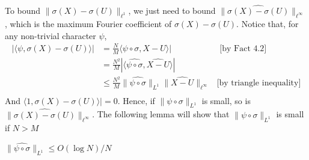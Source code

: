 To bound $\| \sigma(X) - \sigma(U) \|_{\ell^{1}}$, we just need to bound $\|\widehat{ \sigma(X) - \sigma(U)} \|_{\ell^{\infty}}$, which is the maximum Fourier coefficient of $\sigma(X) - \sigma(U)$. Notice that, for any non-trivial character $\psi$,
\begin{align*}
| \langle \psi, \sigma(X) - \sigma(U) \rangle| 
&= \frac{N}{M}\langle \psi \circ \sigma, X -U \rangle | & \text{ [by Fact 4.2]}\\
&= \frac{N^2}{M} | \langle \widehat{\psi \circ \sigma}, \widehat{X-U} \rangle | \\
&\leq \frac{N^2}{M} \| \widehat{\psi \circ \sigma} \|_{L^1} \|\widehat{X-U} \|_{\ell^{\infty}}  & \text{[by triangle inequality]} \\
\end{align*}
And $\langle 1, \sigma(X) - \sigma(U) \rangle| = 0$. Hence, if $\| \psi \circ \sigma \|_{L^1}$ is small, so is $\|\widehat{ \sigma(X) - \sigma(U)} \|_{\ell^{\infty}}$. The following lemma will show that $\| \psi \circ \sigma \|_{L^1}$ is small if $N > M$
\begin{lemma}
$\| \widehat{\psi \circ \sigma} \|_{L^1} \leq O(\log N) /N$ 
\end{lemma}
